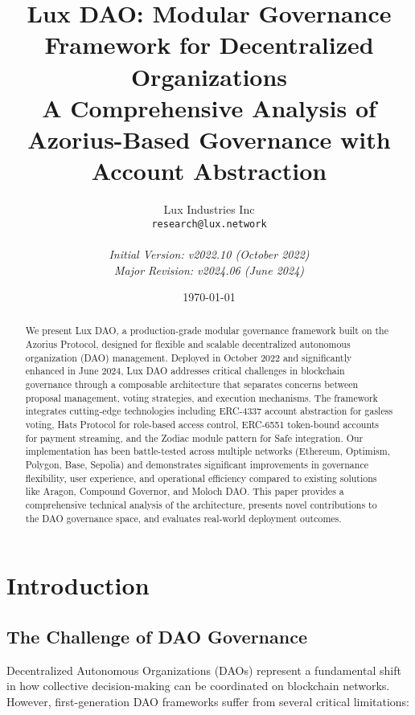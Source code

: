 \documentclass[11pt,a4paper]{article}
\title{\textbf{Lux DAO: Modular Governance Framework for Decentralized Organizations}\\
\large{A Comprehensive Analysis of Azorius-Based Governance with Account Abstraction}}
\author{
Lux Industries Inc\\
\texttt{research@lux.network}\\
\\
\textit{Initial Version: v2022.10 (October 2022)}\\
\textit{Major Revision: v2024.06 (June 2024)}\\
}
\date{\today}
\begin{document}
\maketitle

\begin{abstract}
We present Lux DAO, a production-grade modular governance framework built on the Azorius Protocol, designed for flexible and scalable decentralized autonomous organization (DAO) management. Deployed in October 2022 and significantly enhanced in June 2024, Lux DAO addresses critical challenges in blockchain governance through a composable architecture that separates concerns between proposal management, voting strategies, and execution mechanisms. The framework integrates cutting-edge technologies including ERC-4337 account abstraction for gasless voting, Hats Protocol for role-based access control, ERC-6551 token-bound accounts for payment streaming, and the Zodiac module pattern for Safe integration. Our implementation has been battle-tested across multiple networks (Ethereum, Optimism, Polygon, Base, Sepolia) and demonstrates significant improvements in governance flexibility, user experience, and operational efficiency compared to existing solutions like Aragon, Compound Governor, and Moloch DAO. This paper provides a comprehensive technical analysis of the architecture, presents novel contributions to the DAO governance space, and evaluates real-world deployment outcomes.
\end{abstract}

\section{Introduction}

\subsection{The Challenge of DAO Governance}

Decentralized Autonomous Organizations (DAOs) represent a fundamental shift in how collective decision-making can be coordinated on blockchain networks. However, first-generation DAO frameworks suffer from several critical limitations:
\end{document}
